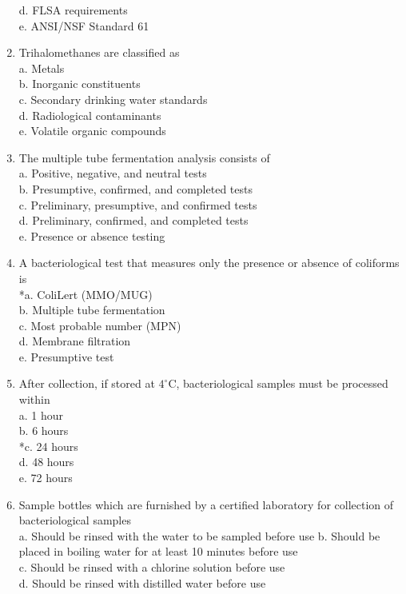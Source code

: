 \begin{enumerate}[1.]
d. FLSA requirements\\
e. ANSI/NSF Standard 61\\
\item Trihalomethanes are classified as\\
a. Metals\\
b. Inorganic constituents\\
c. Secondary drinking water standards\\
d. Radiological contaminants\\
e. Volatile organic compounds\\
\item The multiple tube fermentation analysis consists of\\
a. Positive, negative, and neutral tests\\
b. Presumptive, confirmed, and completed tests\\
c. Preliminary, presumptive, and confirmed tests\\
d. Preliminary, confirmed, and completed tests\\
e. Presence or absence testing\\
\item A bacteriological test that measures only the presence or absence of coliforms is\\
*a. ColiLert (MMO/MUG)\\
b. Multiple tube fermentation\\
c. Most probable number (MPN)\\
d. Membrane filtration\\
e. Presumptive test\\
\item After collection, if stored at $4^{\circ} \mathrm{C}$, bacteriological samples must be processed within\\
a. 1 hour\\
b. 6 hours\\
*c. 24 hours\\
d. 48 hours\\
e. 72 hours\\
\item Sample bottles which are furnished by a certified laboratory for collection of bacteriological samples\\
a. Should be rinsed with the water to be sampled before use b. Should be placed in boiling water for at least 10 minutes before use\\
c. Should be rinsed with a chlorine solution before use\\
d. Should be rinsed with distilled water before use\\

\end{enumerate}
